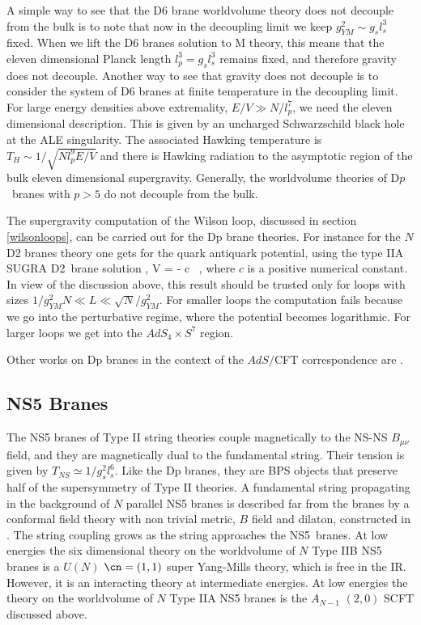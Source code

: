A simple way to see that the D6 brane worldvolume theory does not
decouple from the bulk is to note that now in the decoupling limit we
keep $g_{YM}^2 \sim g_s l_s^3$ fixed.  When we lift the D6 branes
solution to M theory, this means that the eleven dimensional Planck
length $l_p^3 = g_s l_s^3$ remains fixed, and therefore gravity does not
decouple.  Another way to see that gravity does not decouple is to
consider the system of D6 branes at finite temperature in the
decoupling limit. For large energy densities above extremality, $E/V
\gg N/l_p^7$, we need the eleven dimensional description.  This is
given by an uncharged Schwarzschild black hole at the ALE
singularity. The associated Hawking temperature is $T_H \sim
1/\sqrt{Nl_p^9E/V}$ and there is  Hawking radiation to the asymptotic
region of the bulk eleven dimensional supergravity.  Generally, the
worldvolume theories of D$p$~branes with $p >5$ do not decouple from
the bulk.

The supergravity computation of the Wilson loop, discussed in section
\ref{wilsonloops}, can be carried out for the Dp brane theories.  For
instance for the $N$ D2 branes theory one gets for the quark antiquark
potential, using the type IIA SUGRA D2~brane solution
\cite{Maldacena:1998im},
\beq
V = - c  \ ,
\label{VV}
\eeq
where $c$ is a positive numerical constant.  In view of the discussion
above, this result should be trusted only for loops with sizes
$  1/g_{YM}^2N \ll L \ll \sqrt{N}/g^2_{YM}$. For smaller 
loops the computation fails because we go into the perturbative regime, 
where the potential becomes logarithmic. For larger loops we 
get into the $AdS_4 \times S^7$ region. 


Other works on Dp branes in the context of the $AdS/$CFT correspondence are 
\cite{Itzhaki:1998uz,Boonstra:1999mp,Itzhaki:1998ka,Pelc:1999ms,
Hashimoto:1999xx,Youm:1999zs,Lu:1999uc,Lu:1999uv,Barbon:1999zp}.

\subsection{NS5 Branes}
\label{ns5branes}

The NS5 branes of Type II string theories couple magnetically to the
NS-NS $B_{\mu\nu}$ field, and they are magnetically dual to the
fundamental string.  Their tension is given by $T_{NS} \simeq
1/g_s^2l_s^6$.  Like the Dp branes, they are BPS objects that preserve
half of the supersymmetry of Type II theories.  A fundamental string
propagating in the background of $N$ parallel NS5 branes is described
far from the branes by a conformal field theory with non trivial
metric, $B$ field and dilaton, constructed in
\cite{Callan:1991ss}. The string coupling grows as the string
approaches the NS5~branes.  At low energies the six dimensional theory
on the worldvolume of $N$ Type IIB NS5 branes is a $U(N)$ $\cn=(1,1)$
super Yang-Mills theory, which is free in the IR. However, it is an
interacting theory at intermediate energies.  At low energies the
theory on the worldvolume of $N$ Type IIA NS5 branes is the $A_{N-1}$
$(2,0)$ SCFT discussed above.

